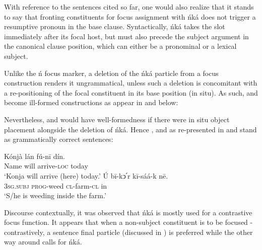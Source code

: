 \documentclass[output=paper,colorlinks,citecolor=brown]{langscibook}
\begin{document}
With reference to the sentences cited so far, one would also realize that it stands to say that fronting constituents for focus assignment with ńká does not trigger a resumptive pronoun in the base clause. Syntactically, ńká takes the slot immediately after its focal host, but must also precede the subject argument in the canonical clause position, which can either be a pronominal or a lexical subject.

Unlike the ń focus marker, a deletion of the ńká particle from a focus construction renders it ungrammatical, unless such a deletion is concomitant with a re-positioning of the focal constituent in its base position (in situ). As such,  and  become ill-formed constructions as appear in  and  below:

\ea%
    \label{ex:bisilki:15}
    \z 
\z 

Nevertheless,  and  would have well-formedness if there were in situ object placement alongside the deletion of ńká. Hence , and  as re-presented in  and  stand as grammatically correct sentences:

\ea%
    \label{ex:bisilki:16}
    \ea\label{ex:bisilki:16a}
    \gll    Kónjà		lán	fú-nī		dín.\\
            Name		will	arrive\textsc{-loc}	today\\
    \glt    ‘Konja will arrive (here) today.’
    \ex\label{ex:bisilki:16b}
    \gll    Ú		bī-kↄ՛r 		kī-sáá-k	nē.\\
            \textsc{3sg.subj}	\textsc{prog-}weed 		\textsc{cl-}farm\textsc{-cl}	in\\
    \glt    ‘S/he is weeding inside the farm.’
    \z
\z

Discourse contextually, it was observed that ńká is mostly used for a contrastive focus function. It appears that when a non-subject constituent is to be focused -contrastively, a sentence final particle (discussed in ) is preferred while the other way around calls for ńká.
\end{document}
